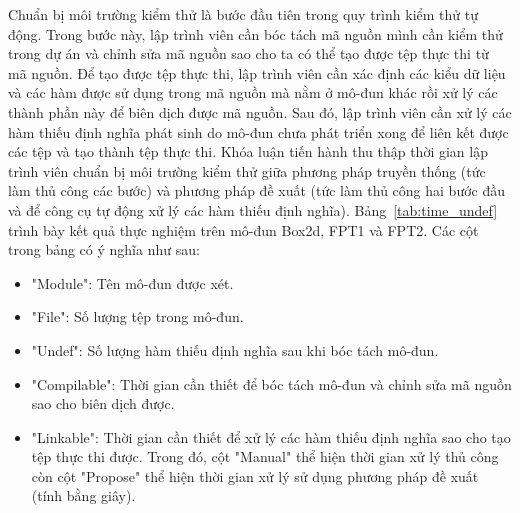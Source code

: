 Chuẩn bị môi trường kiểm thử là bước đầu tiên trong quy trình kiểm thử tự động. Trong bước này, lập trình viên cần bóc tách mã nguồn mình cần kiểm thử trong dự án và chỉnh sửa mã nguồn sao cho ta có thể tạo được tệp thực thi từ mã nguồn. Để tạo được tệp thực thi, lập trình viên cần xác định các kiểu dữ liệu và các hàm được sử dụng trong mã nguồn mà nằm ở mô-đun khác rồi xử lý các thành phần này để biên dịch được mã nguồn. Sau đó, lập trình viên cần xử lý các hàm thiếu định nghĩa phát sinh do mô-đun chưa phát triển xong để liên kết được các tệp và tạo thành tệp thực thi. Khóa luận tiến hành thu thập thời gian lập trình viên chuẩn bị môi trường kiểm thử giữa phương pháp truyền thống (tức làm thủ công các bước) và phương pháp đề xuất (tức làm thủ công hai bước đầu và để công cụ tự động xử lý các hàm thiếu định nghĩa).
Bảng~\ref{tab:time_undef} trình bày kết quả thực nghiệm trên mô-đun Box2d, FPT1 và FPT2. Các cột trong bảng có ý nghĩa như sau:
\begin{itemize}
    \item "Module": Tên mô-đun được xét.
    \item "File": Số lượng tệp trong mô-đun.
    \item "Undef": Số lượng hàm thiếu định nghĩa sau khi bóc tách mô-đun.
    \item "Compilable": Thời gian cần thiết để bóc tách mô-đun và chỉnh sửa mã nguồn sao cho biên dịch được.
    \item "Linkable": Thời gian cần thiết để xử lý các hàm thiếu định nghĩa sao cho tạo tệp thực thi được. Trong đó, cột "Manual" thể hiện thời gian xử lý thủ công còn cột "Propose" thể hiện thời gian xử lý sử dụng phương pháp đề xuất (tính bằng giây).
\end{itemize}

